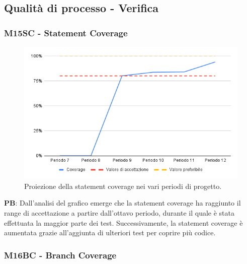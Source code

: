 \subsection{Qualità di processo - Verifica}

\vspace{0.3cm}

\subsubsection{M15SC - Statement Coverage}

\vspace{0.3cm}

\begin{figure}[H]
    \centering
    \includegraphics[width=1\textwidth]{../Images/PianoDiQualifica/M15SC.png}
    \caption{Proiezione della statement coverage nei vari periodi di progetto.}
    \label{fig:13}
\end{figure}

\vspace{0.2cm}

\textbf{PB}: Dall’analisi del grafico emerge che la statement coverage ha raggiunto il range di accettazione a partire dall'ottavo periodo, durante il quale è stata effettuata la maggior parte dei test. Successivamente, la statement coverage è aumentata grazie all’aggiunta di ulteriori test per coprire più codice.

\vspace{0.2cm}

\subsubsection{M16BC - Branch Coverage}

\vspace{0.3cm}

